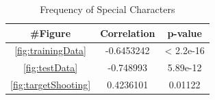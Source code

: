 \documentclass{sig-alternate-05-2015}
\begin{document}
\begin{table}
\centering
\begin{tabular}{|c|c|c|} \hline
\#Figure & Correlation & p-value\\ \hline
\ref{fig:trainingData} & -0.6453242 & < 2.2e-16\\ \hline
\ref{fig:testData} & -0.748993 & 5.89e-12\\ \hline
\ref{fig:targetShooting} & 0.4236101 & 0.01122\\ \hline
\end{tabular}
\caption{Frequency of Special Characters}
\label{tab:correlations}
\end{table}


%

%
%

\end{document}

